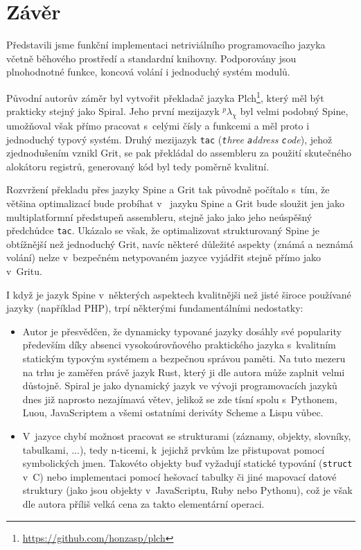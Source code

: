 \chapter{Závěr}

Představili jsme funkční implementaci netriviálního programovacího jazyka včetně
běhového prostředí a standardní knihovny. Podporovány jsou plnohodnotné funkce,
koncová volání i jednoduchý systém modulů.

Původní autorův záměr byl vytvořit překladač jazyka
Plch\footnote{\url{https://github.com/honzasp/plch}}, který měl být prakticky
stejný jako Spiral. Jeho první mezijazyk $^p\lambda_\chi$ byl velmi podobný
Spine, umožňoval však přímo pracovat s~celými čísly a funkcemi a měl proto i
jednoduchý typový systém. Druhý mezijazyk \texttt{tac} (\emph{\texttt{t}hree
\texttt{a}ddress \texttt{c}ode}), jehož zjednodušením vznikl Grit, se pak
překládal do assembleru za použití skutečného alokátoru registrů, generovaný kód
byl tedy poměrně kvalitní.

Rozvržení překladu přes jazyky Spine a Grit tak původně počítalo s~tím, že
většina optimalizací bude probíhat v~ jazyku Spine a Grit
bude sloužit jen jako multiplatformní předstupeň assembleru, stejně jako jako
jeho neúspěšný předchůdce \texttt{tac}. Ukázalo se však, že optimalizovat
strukturovaný Spine je obtížnější než jednoduchý Grit, navíc některé důležité
aspekty (známá a neznámá volání) nelze v~bezpečném netypovaném jazyce vyjádřit
stejně přímo jako v~Gritu.

I když je jazyk Spine v~některých aspektech kvalitnějši než jisté široce
používané jazyky (například  PHP), trpí některými fundamentálními
nedostatky:

\begin{itemize}
  \item Autor je přesvědčen, že dynamicky typované jazyky dosáhly své popularity
    především díky absenci vysokoúrovňového praktického jazyka s~kvalitním
    statickým typovým systémem a bezpečnou správou paměti. Na tuto mezeru na
    trhu je zaměřen právě jazyk Rust, který ji dle autora může zaplnit velmi
    důstojně. Spiral je jako dynamický jazyk ve vývoji programovacích jazyků
    dnes již naprosto nezajímavá větev, jelikož se zde tísní spolu s~Pythonem,
    Luou, JavaScriptem a všemi ostatními deriváty Scheme a Lispu vůbec.

  \item V~jazyce chybí možnost pracovat se strukturami (záznamy, objekty,
    slovníky, tabulkami, ...), tedy n-ticemi, k~jejichž prvkům lze přistupovat
    pomocí symbolických jmen. Takovéto objekty buď vyžadují statické typování
    (\texttt{struct} v~C) nebo implementaci pomocí hešovací tabulky či jiné
    mapovací datové struktury (jako jsou objekty v~JavaScriptu, Ruby nebo
    Pythonu), což je však dle autora příliš velká cena za takto elementární
    operaci.
\end{itemize}

